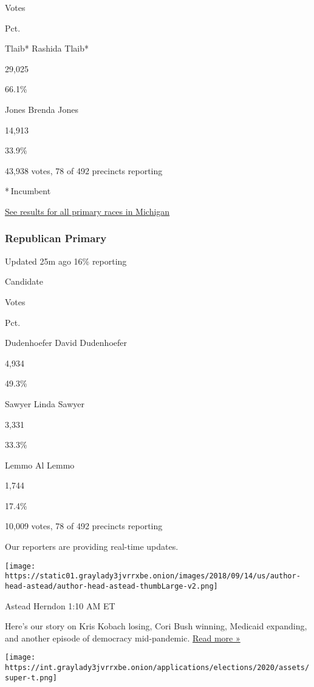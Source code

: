 Votes

Pct.

 Tlaib* Rashida Tlaib*

29,025

66.1\%

 Jones Brenda Jones

14,913

33.9\%

43,938 votes, 78 of 492 precincts reporting

* Incumbent

\href{https://www.nytimes3xbfgragh.onion/interactive/2020/08/04/us/elections/results-michigan-primary-elections.html}{See
results for all primary races in Michigan}

\hypertarget{republican-primary}{%
\subsubsection{Republican Primary}\label{republican-primary}}

Updated 25m ago 16\% reporting

Candidate

Votes

Pct.

 Dudenhoefer David Dudenhoefer

4,934

49.3\%

 Sawyer Linda Sawyer

3,331

33.3\%

 Lemmo Al Lemmo

1,744

17.4\%

10,009 votes, 78 of 492 precincts reporting

Our reporters are providing real-time updates.

\texttt{[image: https://static01.graylady3jvrrxbe.onion/images/2018/09/14/us/author-head-astead/author-head-astead-thumbLarge-v2.png]}

Astead Herndon 1:10 AM ET

Here's our story on Kris Kobach losing, Cori Bush winning, Medicaid
expanding, and another episode of democracy mid-pandemic.
\href{https://www.nytimes3xbfgragh.onion/2020/08/04/us/politics/kobach-tlaib.html?action=click\&module=ELEX_results\&pgtype=Interactive\&region=ReporterUpdates}{Read
more »}

\texttt{[image: https://int.graylady3jvrrxbe.onion/applications/elections/2020/assets/super-t.png]}

